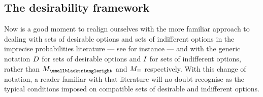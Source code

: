 \documentclass[preprint]{isipta2025}
\begin{document}
\subsection{The desirability framework}\label{sec::desirability}
Now is a good moment to realign ourselves with the more familiar approach to dealing with sets of desirable options and sets of indifferent options in the imprecise probabilities literature --- see for instance \cite{cooman2010,decooman2015:coherent:predictive:inference,devos2023:indistinguishability,debock2016:partial:exchangeability} --- and with the generic notation \(D_{}\) for sets of desirable options and \(I_{}\) for sets of indifferent options, rather than \(\M_\des\) and \(M_\equiv\) respectively.
With this change of notation, a reader familiar with that literature  will no doubt recognise  as the typical conditions imposed on compatible sets of desirable and indifferent options.
\end{document}
